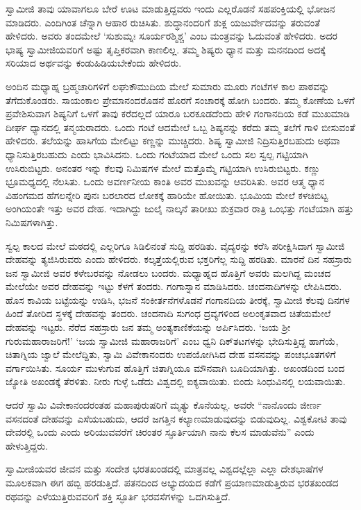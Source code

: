  ಸ್ವಾಮೀಜಿ ತಾವು ಯಾವಾಗಲೂ ಬೇರೆ ಊಟ ಮಾಡುತ್ತಿದ್ದವರು ಇಂದು ಎಲ್ಲರೊಡನೆ ಸಹಪಂಕ್ತಿಯಲ್ಲಿ ಭೋಜನ ಮಾಡಿದರು. ಎಂದಿಗಿಂತ ಚೆನ್ನಾಗಿ ಆಹಾರ ರುಚಿಸಿತು. ಶುದ್ಧಾನಂದರಿಗೆ ಶುಕ್ಲ ಯಜುರ್ವೇದವನ್ನು ತರುವಂತೆ ಹೇಳಿದರು. ಅವರು ತಂದಮೇಲೆ ‘ಸುಶುಮ್ನಃ ಸೂರ್ಯರಶ್ಮಿಶ್ಚ’ ಎಂಬ ಮಂತ್ರವನ್ನು ಓದುವಂತೆ ಹೇಳಿದರು. ಅದರ ಭಾಷ್ಯ ಸ್ವಾಮೀಜಿಯವರಿಗೆ ಅಷ್ಟು ತೃಪ್ತಿಕರವಾಗಿ ಕಾಣಲಿಲ್ಲ. ತಮ್ಮ ಶಿಷ್ಯರು ಧ್ಯಾನ ಮತ್ತು ಮನನದಿಂದ ಅದಕ್ಕೆ ಸರಿಯಾದ ಅರ್ಥವನ್ನು ಕಂಡುಹಿಡಿಯಬೇಕೆಂದು ಹೇಳಿದರು. 

 ಅಂದಿನ ಮಧ್ಯಾಹ್ನ ಬ್ರಹ್ಮಚಾರಿಗಳಿಗೆ ಲಘುಕೌಮುದಿಯ ಮೇಲೆ ಸುಮಾರು ಮೂರು ಗಂಟೆಗಳ ಕಾಲ ಪಾಠವನ್ನು ತೆಗೆದುಕೊಂಡರು. ಸಾಯಂಕಾಲ ಪ್ರೇಮಾನಂದರೊಡನೆ ಹೊರಗೆ ಸಂಚಾರಕ್ಕೆ ಹೋಗಿ ಬಂದರು. ತಮ್ಮ ಕೋಣೆಯ ಒಳಗೆ ಪ್ರವೇಶಿಸುವಾಗ ಶಿಷ್ಯನಿಗೆ ಒಳಗೆ ತಾವು ಕರೆದಲ್ಲದೆ ಯಾರೂ ಬರಕೂಡದೆಂದು ಹೇಳಿ ಗಂಗಾನದಿಯ ಕಡೆ ಮುಖಮಾಡಿ ದೀರ್ಘ ಧ್ಯಾನದಲ್ಲಿ ತನ್ಮಯರಾದರು. ಒಂದು ಗಂಟೆ ಆದಮೇಲೆ ಒಬ್ಬ ಶಿಷ್ಯನನ್ನು ಕರೆದು ತಮ್ಮ ತಲೆಗೆ ಗಾಳಿ ಬೀಸುವಂತೆ ಹೇಳಿದರು. ತಲೆಯನ್ನು ಹಾಸಿಗೆಯ ಮೇಲಿಟ್ಟು ಕಣ್ಣನ್ನು ಮುಚ್ಚಿದರು. ಶಿಷ್ಯ ಸ್ವಾಮೀಜಿ ನಿದ್ರಿಸುತ್ತಿರಬಹುದು ಅಥವಾ ಧ್ಯಾನಿಸುತ್ತಿರಬಹುದು ಎಂದು ಭಾವಿಸಿದನು. ಒಂದು ಗಂಟೆಯಾದ ಮೇಲೆ ಒಂದು ಸಲ ಸ್ವಲ್ಪ ಗಟ್ಟಿಯಾಗಿ ಉಸಿರುಬಿಟ್ಟರು. ಅನಂತರ ಇನ್ನು ಕೆಲವು ನಿಮಿಷಗಳ ಮೇಲೆ ಮತ್ತೊಮ್ಮೆ ಗಟ್ಟಿಯಾಗಿ ಉಸಿರುಬಿಟ್ಟರು. ಕಣ್ಣು ಭ್ರೂಮಧ್ಯದಲ್ಲಿ ನೆಲಸಿತು. ಒಂದು ಅವರ್ಣನೀಯ ಕಾಂತಿ ಅವರ ಮುಖವನ್ನು ಆವರಿಸಿತು. ಅವರ ಆತ್ಮ ಧ್ಯಾನ ವಿಹಂಗಮದ ಹೆಗಲನ್ನೇರಿ ಪುನಃ ಬರಲಾರದ ಲೋಕಕ್ಕೆ ಹಾರಿಯೇ ಹೋಯಿತು. ಭೂಮಿಯ ಮೇಲೆ ಕಳಚಿಬಿಟ್ಟ ಅಂಗಿಯಂತೇ ಇತ್ತು ಅವರ ದೇಹ. ಇದಾಗಿದ್ದು ಜುಲೈ ನಾಲ್ಕನೆ ತಾರೀಖು ಶುಕ್ರವಾರ ರಾತ್ರಿ ಒಂಭತ್ತು ಗಂಟೆಯಾಗಿ ಹತ್ತು ನಿಮಿಷಗಳಾಗಿತ್ತು. 

 ಸ್ವಲ್ಪ ಕಾಲದ ಮೇಲೆ ಮಠದಲ್ಲಿ ಎಲ್ಲರಿಗೂ ಸಿಡಿಲಿನಂತೆ ಸುದ್ದಿ ಹರಡಿತು. ವೈದ್ಯರನ್ನು ಕರೆಸಿ ಪರೀಕ್ಷಿಸಿದಾಗ ಸ್ವಾಮೀಜಿ ದೇಹವನ್ನು ತ್ಯಜಿಸಿರುವರು ಎಂದು ಹೇಳಿದರು. ಕಲ್ಕತ್ತೆಯಲ್ಲಿರುವ ಭಕ್ತರಿಗೆಲ್ಲ ಸುದ್ದಿ ಹರಡಿತು. ಮಾರನೆ ದಿನ ಸಹಸ್ರಾರು ಜನ ಸ್ವಾಮೀಜಿ ಅವರ ಕಳೇಬರವನ್ನು ನೋಡಲು ಬಂದರು. ಮಧ್ಯಾಹ್ನದ ಹೊತ್ತಿಗೆ ಅವರು ಮಲಗಿದ್ದ ಮಂಚದ ಮೇಲೆಯೇ ಅವರ ದೇಹವನ್ನು ಇಟ್ಟು ಕೆಳಗೆ ತಂದರು. ಗಂಗಾಸ್ನಾನ ಮಾಡಿಸಿದರು. ಚಂದನಾದಿಗಳನ್ನು ಲೇಪಿಸಿದರು. ಹೊಸ ಕಾವಿಯ ಬಟ್ಟೆಯನ್ನು ಉಡಿಸಿ, ಭಜನೆ ಸಂಕೀರ್ತನೆಗಳೊಡನೆ ಗಂಗಾನದಿಯ ತೀರಕ್ಕೆ, ಸ್ವಾಮೀಜಿ ಕೆಲವು ದಿನಗಳ ಹಿಂದೆ ತೋರಿದ ಸ್ಥಳಕ್ಕೆ ದೇಹವನ್ನು ತಂದರು. ಚಂದನಾದಿ ಸುಗಂಧ ದ್ರವ್ಯಗಳಿಂದ ಅಲಂಕೃತವಾದ ಚಿತೆಯಮೇಲೆ ದೇಹವನ್ನು ಇಟ್ಟರು. ನೆರೆದ ಸಹಸ್ರಾರು ಜನ ತಮ್ಮ ಅಂತ್ಯಕಾಣಿಕೆಯನ್ನು ಅರ್ಪಿಸಿದರು. ‘ಜಯ ಶ‍್ರೀ ಗುರುಮಹಾರಾಜರಿಗೆ!’ ‘ಜಯ ಸ್ವಾಮೀಜಿ ಮಹಾರಾಜರಿಗೆ’ ಎಂಬ ಧ್ವನಿ ದಿಕ್‌ತಟಗಳನ್ನು ಭೇದಿಸುತ್ತಿದ್ದ ಹಾಗೆಯೆ, ಚಿತಾಗ್ನಿಯ ಜ್ವಾಲೆ ಮೇಲೆದ್ದಿತು, ಸ್ವಾಮಿ ವಿವೇಕಾನಂದರು ಉಪಯೋಗಿಸಿದ ದೇಹ ವಸನವನ್ನು ಪಂಚಭೂತಗಳಿಗೆ ವರ್ಗಾಯಿಸಿತು. ಸೂರ್ಯ ಮುಳುಗುವ ಹೊತ್ತಿಗೆ ಚಿತಾಗ್ನಿಯೂ ಮೌನವಾಗಿ ಬೂದಿಯಾಗಿತ್ತು. ಅಖಂಡದಿಂದ ಬಂದ ಜ್ಯೋತಿ ಅಖಂಡಕ್ಕೆ ತೆರಳಿತು. ನೀರು ಗುಳ್ಳೆ ಒಡೆದು ವಿಶ್ವದಲ್ಲಿ ಐಕ್ಯವಾಯಿತು. ಬಿಂದು ಸಿಂಧುವಿನಲ್ಲಿ ಲಯವಾಯಿತು. 

 ಆದರೆ ಸ್ವಾಮಿ ವಿವೇಕಾನಂದರಂತಹ ಮಹಾಪುರುಷರಿಗೆ ಮೃತ್ಯು ಕೊನೆಯಲ್ಲ. ಅವರೇ “ನಾನೊಂದು ಜೀರ್ಣ ವಸನದಂತೆ ದೇಹವನ್ನು ಎಸೆಯಬಹುದು, ಆದರೆ ಜಗತ್ತಿನ ಕಲ್ಯಾಣಮಾಡುವುದನ್ನು ಬಿಡುವುದಿಲ್ಲ. ವಿಶ್ವಕೋಟಿ ತಾವು ದೇವರಲ್ಲಿ ಒಂದು ಎಂದು ಅರಿಯುವವರೆಗೆ ಚಿರಂತರ ಸ್ಫೂರ್ತಿಯಾಗಿ ನಾನು ಕೆಲಸ ಮಾಡುವೆನು” ಎಂದು ಹೇಳುತ್ತಿದ್ದರು. 

 ಸ್ವಾಮೀಜಿಯವರ ಜೀವನ ಮತ್ತು ಸಂದೇಶ ಭರತಖಂಡದಲ್ಲಿ ಮಾತ್ರವಲ್ಲ ವಿಶ್ವದಲ್ಲೆಲ್ಲಾ ಎಲ್ಲಾ ದೇಶಭಾಷೆಗಳ ಮೂಲಕವಾಗಿ ಈಗ ಹಬ್ಬಿ ಹರಡುತ್ತಿದೆ. ಪತನದಿಂದ ಅಭ್ಯುದಯದ ಕಡೆಗೆ ಪ್ರಯಾಣಮಾಡುತ್ತಿರುವ ಭರತಖಂಡದ ರಥವನ್ನು ಎಳೆಯುತ್ತಿರುವವರಿಗೆ ಶಕ್ತಿ ಸ್ಫೂರ್ತಿ ಭರವಸೆಗಳನ್ನು ಒದಗಿಸುತ್ತಿದೆ. 

\delimiter

